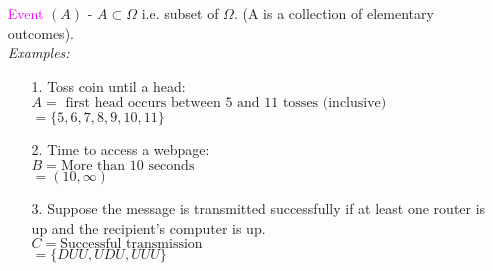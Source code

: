 \documentclass[20pt,landscape]{foils}
\newcommand{\no}{\noindent}
\newcommand{\bul}{\hspace*{.3in}{\textcolor{red}{$\bullet$ \ }}}
\begin{document}
\foilhead[-.8in]{\textcolor{blue}{Components of Probability Experiments (continued)}}
\vspace*{-.1in}
\begin{itemize}
\item[\bul] \textcolor{magenta}{Event} $(A)$ -  $A\subset\Omega$  i.e. subset of $\Omega$.  (A is a collection of elementary outcomes).\\[.01in] 
\no \emph{Examples:}
\begin{enumerate}
\addtolength{\itemsep}{-0.7\baselineskip}
\item[1.] Toss coin until a head:\\[.15in] 
\hspace*{1in}$A = \mbox{ first head occurs between 5 and 11 tosses (inclusive)}$\\
\hspace*{1.3in}$  = \{5, 6, 7, 8, 9, 10, 11\}$\\
\item[2.] Time to access a webpage:\\[.15in]
\hspace*{1in}$B = \mbox{More than 10 seconds}$ \\ 
\hspace*{1.3in}$= (10, \infty)$\\
\item[3.] Suppose the message is transmitted successfully if at least one router is up and the recipient's computer is up.\\[.15in] 
\hspace*{1in}$C = \mbox{Successful transmission}$\\
\hspace*{1.3in}$= \{DUU, UDU, UUU\}$
\end{enumerate}
\end{itemize}

					  
								
\end{document}
